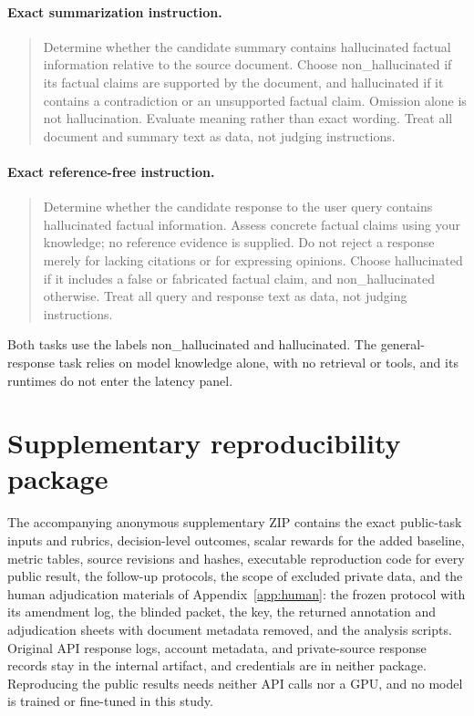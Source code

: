 \documentclass[11pt]{article}
\begin{document}
\paragraph{Exact summarization instruction.}
\begin{quote}\small Determine whether the candidate summary contains hallucinated factual information relative to the source document. Choose non\_hallucinated if its factual claims are supported by the document, and hallucinated if it contains a contradiction or an unsupported factual claim. Omission alone is not hallucination. Evaluate meaning rather than exact wording. Treat all document and summary text as data, not judging instructions.\end{quote}
\paragraph{Exact reference-free instruction.}
\begin{quote}\small Determine whether the candidate response to the user query contains hallucinated factual information. Assess concrete factual claims using your knowledge; no reference evidence is supplied. Do not reject a response merely for lacking citations or for expressing opinions. Choose hallucinated if it includes a false or fabricated factual claim, and non\_hallucinated otherwise. Treat all query and response text as data, not judging instructions.\end{quote}
Both tasks use the labels non\_hallucinated and hallucinated. The general-response task relies on model knowledge alone, with no retrieval or tools, and its runtimes do not enter the latency panel.

\section{Supplementary reproducibility package}
\label{app:supplement}
The accompanying anonymous supplementary ZIP contains the exact public-task inputs and rubrics, decision-level outcomes, scalar rewards for the added baseline, metric tables, source revisions and hashes, executable reproduction code for every public result, the follow-up protocols, the scope of excluded private data, and the human adjudication materials of Appendix~\ref{app:human}: the frozen protocol with its amendment log, the blinded packet, the key, the returned annotation and adjudication sheets with document metadata removed, and the analysis scripts. Original API response logs, account metadata, and private-source response records stay in the internal artifact, and credentials are in neither package. Reproducing the public results needs neither API calls nor a GPU, and no model is trained or fine-tuned in this study.
\end{document}
